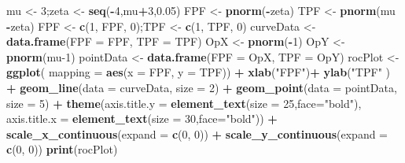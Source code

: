 \documentclass[
]{book}
\newenvironment{Shaded}{\begin{snugshade}}{\end{snugshade}}
\newcommand{\DataTypeTok}[1]{\textcolor[rgb]{0.13,0.29,0.53}{#1}}
\newcommand{\DecValTok}[1]{\textcolor[rgb]{0.00,0.00,0.81}{#1}}
\newcommand{\FloatTok}[1]{\textcolor[rgb]{0.00,0.00,0.81}{#1}}
\newcommand{\KeywordTok}[1]{\textcolor[rgb]{0.13,0.29,0.53}{\textbf{#1}}}
\newcommand{\NormalTok}[1]{#1}
\newcommand{\OperatorTok}[1]{\textcolor[rgb]{0.81,0.36,0.00}{\textbf{#1}}}
\newcommand{\StringTok}[1]{\textcolor[rgb]{0.31,0.60,0.02}{#1}}
\begin{document}
\begin{Shaded}
\begin{Highlighting}[]
\NormalTok{mu <-}\StringTok{ }\DecValTok{3}\NormalTok{;zeta <-}\StringTok{ }\KeywordTok{seq}\NormalTok{(}\OperatorTok{-}\DecValTok{4}\NormalTok{,mu}\OperatorTok{+}\DecValTok{3}\NormalTok{,}\FloatTok{0.05}\NormalTok{)}
\NormalTok{FPF <-}\StringTok{ }\KeywordTok{pnorm}\NormalTok{(}\OperatorTok{-}\NormalTok{zeta)}
\NormalTok{TPF <-}\StringTok{ }\KeywordTok{pnorm}\NormalTok{(mu }\OperatorTok{-}\NormalTok{zeta) }
\NormalTok{FPF <-}\StringTok{ }\KeywordTok{c}\NormalTok{(}\DecValTok{1}\NormalTok{, FPF, }\DecValTok{0}\NormalTok{);TPF <-}\StringTok{ }\KeywordTok{c}\NormalTok{(}\DecValTok{1}\NormalTok{, TPF, }\DecValTok{0}\NormalTok{)}
\NormalTok{curveData <-}\StringTok{ }\KeywordTok{data.frame}\NormalTok{(}\DataTypeTok{FPF =}\NormalTok{ FPF, }\DataTypeTok{TPF =}\NormalTok{ TPF)}
\NormalTok{OpX <-}\StringTok{ }\KeywordTok{pnorm}\NormalTok{(}\OperatorTok{-}\DecValTok{1}\NormalTok{)}
\NormalTok{OpY <-}\StringTok{ }\KeywordTok{pnorm}\NormalTok{(mu}\DecValTok{-1}\NormalTok{)}
\NormalTok{pointData <-}\StringTok{ }\KeywordTok{data.frame}\NormalTok{(}\DataTypeTok{FPF =}\NormalTok{ OpX, }\DataTypeTok{TPF =}\NormalTok{ OpY)}
\NormalTok{rocPlot <-}\StringTok{ }\KeywordTok{ggplot}\NormalTok{(}
  \DataTypeTok{mapping =} \KeywordTok{aes}\NormalTok{(}\DataTypeTok{x =}\NormalTok{ FPF, }\DataTypeTok{y =}\NormalTok{ TPF)) }\OperatorTok{+}\StringTok{ }
\StringTok{  }\KeywordTok{xlab}\NormalTok{(}\StringTok{"FPF"}\NormalTok{)}\OperatorTok{+}\StringTok{ }\KeywordTok{ylab}\NormalTok{(}\StringTok{"TPF"}\NormalTok{ ) }\OperatorTok{+}\StringTok{ }
\StringTok{  }\KeywordTok{geom_line}\NormalTok{(}\DataTypeTok{data =}\NormalTok{ curveData, }\DataTypeTok{size =} \DecValTok{2}\NormalTok{) }\OperatorTok{+}\StringTok{ }
\StringTok{  }\KeywordTok{geom_point}\NormalTok{(}\DataTypeTok{data =}\NormalTok{ pointData, }\DataTypeTok{size =} \DecValTok{5}\NormalTok{) }\OperatorTok{+}
\StringTok{  }\KeywordTok{theme}\NormalTok{(}\DataTypeTok{axis.title.y =} \KeywordTok{element_text}\NormalTok{(}\DataTypeTok{size =} \DecValTok{25}\NormalTok{,}\DataTypeTok{face=}\StringTok{"bold"}\NormalTok{),}
        \DataTypeTok{axis.title.x =} \KeywordTok{element_text}\NormalTok{(}\DataTypeTok{size =} \DecValTok{30}\NormalTok{,}\DataTypeTok{face=}\StringTok{"bold"}\NormalTok{))  }\OperatorTok{+}
\StringTok{  }\KeywordTok{scale_x_continuous}\NormalTok{(}\DataTypeTok{expand =} \KeywordTok{c}\NormalTok{(}\DecValTok{0}\NormalTok{, }\DecValTok{0}\NormalTok{)) }\OperatorTok{+}\StringTok{ }
\StringTok{  }\KeywordTok{scale_y_continuous}\NormalTok{(}\DataTypeTok{expand =} \KeywordTok{c}\NormalTok{(}\DecValTok{0}\NormalTok{, }\DecValTok{0}\NormalTok{)) }
\KeywordTok{print}\NormalTok{(rocPlot)}
\end{Highlighting}
\end{Shaded}
\end{document}
